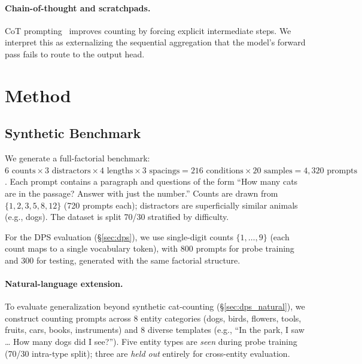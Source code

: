 \documentclass{article}
\begin{document}
\paragraph{Chain-of-thought and scratchpads.}
CoT prompting~\citep{wei2022chain} improves counting by forcing explicit intermediate steps.
We interpret this as externalizing the sequential aggregation that the model's
forward pass fails to route to the output head.

\section{Method}
\label{sec:method}

\subsection{Synthetic Benchmark}

We generate a full-factorial benchmark:
$6 \text{ counts} \times 3 \text{ distractors} \times 4 \text{ lengths} \times 3 \text{ spacings}
= 216 \text{ conditions} \times 20 \text{ samples} = 4{,}320 \text{ prompts}$.
Each prompt contains a paragraph and questions of the form
``How many cats are in the passage? Answer with just the number.''
Counts are drawn from $\{1, 2, 3, 5, 8, 12\}$ (720 prompts each);
distractors are superficially similar animals (e.g., dogs).
The dataset is split 70/30 stratified by difficulty.

For the DPS evaluation (\S\ref{sec:dps}), we use single-digit counts
$\{1, \ldots, 9\}$ (each count maps to a single vocabulary token), with
800 prompts for probe training and 300 for testing, generated with the
same factorial structure.

\paragraph{Natural-language extension.}
To evaluate generalization beyond synthetic cat-counting (\S\ref{sec:dps_natural}),
we construct counting prompts across 8 entity categories
(dogs, birds, flowers, tools, fruits, cars, books, instruments)
and 8 diverse templates (e.g., ``In the park, I saw \ldots{} How many dogs did I see?'').
Five entity types are \emph{seen} during probe training (70/30 intra-type split);
three are \emph{held out} entirely for cross-entity evaluation.
\end{document}
